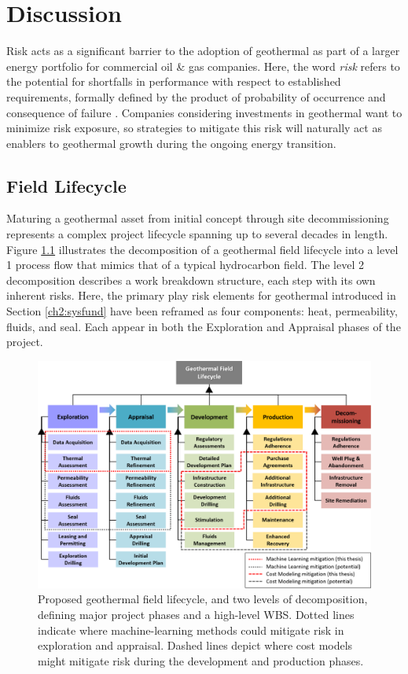 \chapter{Discussion}\label{ch7:discuss}
\label{ch7:discussion}

Risk acts as a significant barrier to the adoption of geothermal as part of a larger energy portfolio for commercial oil \& gas companies. Here, the word \textit{risk} refers to the potential for shortfalls in performance with respect to established requirements, formally defined by the product of probability of occurrence and consequence of failure \citep{malone_development_2004,nasa_s3001_2017}. Companies considering investments in geothermal want to minimize risk exposure, so strategies to mitigate this risk will naturally act as enablers to geothermal growth during the ongoing energy transition.

\section{Field Lifecycle}\label{ch7:field_lifecycle}

Maturing a geothermal asset from initial concept through site decommissioning represents a complex project lifecycle spanning up to several decades in length. Figure \ref{fig:geothermal_field_lifecycle} illustrates the decomposition of a geothermal field lifecycle into a level 1 process flow that mimics that of a typical hydrocarbon field. The level 2 decomposition describes a work breakdown structure, each step with its own inherent risks. Here, the primary play risk elements for geothermal introduced in Section \ref{ch2:sysfund} have been reframed as four components: heat, permeability, fluids, and seal. Each appear in both the Exploration and Appraisal phases of the project. 

\begin{figure}
\centering
\includegraphics[width=\textwidth]{templates/images/Figure-SystemDecomposition.png}
\caption[Geothermal field lifecycle]{Proposed geothermal field lifecycle, and two levels of decomposition, defining major project phases and a high-level WBS. Dotted lines indicate where machine-learning methods could mitigate risk in exploration and appraisal. Dashed lines depict where cost models might mitigate risk during the development and production phases.}
\label{fig:geothermal_field_lifecycle}
\end{figure}

